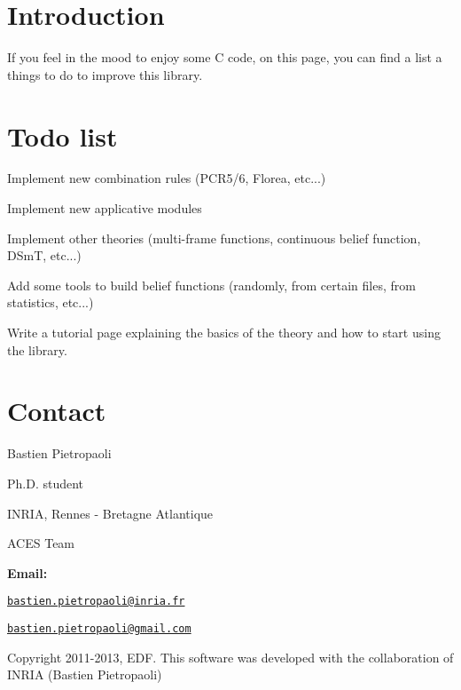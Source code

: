 \hypertarget{_t_o_d_o_TODO_Intro}{}\section{Introduction}\label{_t_o_d_o_TODO_Intro}
If you feel in the mood to enjoy some C code, on this page, you can find a list a things to do to improve this library.\hypertarget{_t_o_d_o_Todo_list}{}\section{Todo list}\label{_t_o_d_o_Todo_list}
\begin{DoxyItemize}
\item Implement new combination rules (P\-C\-R5/6, Florea, etc...) \item Implement new applicative modules \item Implement other theories (multi-\/frame functions, continuous belief function, D\-Sm\-T, etc...) \item Add some tools to build belief functions (randomly, from certain files, from statistics, etc...) \item Write a tutorial page explaining the basics of the theory and how to start using the library.\end{DoxyItemize}
\hypertarget{_t_o_d_o_Todo_contact}{}\section{Contact}\label{_t_o_d_o_Todo_contact}
Bastien Pietropaoli \par
 Ph.\-D. student \par
 I\-N\-R\-I\-A, Rennes -\/ Bretagne Atlantique \par
 A\-C\-E\-S Team \par


{\bfseries Email\-:} \par
 \href{mailto:bastien.pietropaoli@inria.fr}{\tt bastien.\-pietropaoli@inria.\-fr} \par
 \href{mailto:bastien.pietropaoli@gmail.com}{\tt bastien.\-pietropaoli@gmail.\-com} \par


Copyright 2011-\/2013, E\-D\-F. This software was developed with the collaboration of I\-N\-R\-I\-A (Bastien Pietropaoli) 